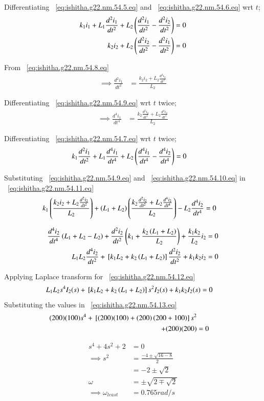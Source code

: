 \documentclass[journal,12pt,twocolumn]{IEEEtran}
\theoremstyle{remark}
\begin{document}
Differentiating ~\eqref{eq:ishitha.g22.nm.54.5.eq} and ~\eqref{eq:ishitha.g22.nm.54.6.eq} wrt $t$;
\begin{align}
k_1i_1 + L_1\frac{d^2i_1}{dt^2}+L_2\left(\frac{d^2i_1}{dt^2}-\frac{d^2i_2}{dt^2}\right)&=0
\label{eq:ishitha.g22.nm.54.7.eq} \\
 k_2i_2 + L_2\left(\frac{d^2i_2}{dt^2}-\frac{d^2i_1}{dt^2}\right)&=0
 \label{eq:ishitha.g22.nm.54.8.eq}
\end{align}

From ~\eqref{eq:ishitha.g22.nm.54.8.eq}
\begin{align}
\implies \frac{d^2i_1}{dt^2}&=\frac{k_2i_2+L_2\frac{d^2i_2}{dt^2}}{L_2}
\label{eq:ishitha.g22.nm.54.9.eq}
\end{align}

Differentiating ~\eqref{eq:ishitha.g22.nm.54.9.eq} wrt $t$ twice;
\begin{align}
\implies \frac{d^4i_1}{dt^4}&=\frac{k_2\frac{d^2i_2}{dt^2}+L_2\frac{d^4i_2}{dt^4}}{L_2}
\label{eq:ishitha.g22.nm.54.10.eq}
\end{align}

Differentiating ~\eqref{eq:ishitha.g22.nm.54.7.eq} wrt $t$ twice;
\begin{align}
k_1\frac{d^2i_1}{dt^2} + L_1\frac{d^4i_1}{dt^4}+L_2\left(\frac{d^4i_1}{dt^4}-\frac{d^4i_2}{dt^4}\right)&=0
\label{eq:ishitha.g22.nm.54.11.eq}
\end{align}

Substituting  ~\eqref{eq:ishitha.g22.nm.54.9.eq} and ~\eqref{eq:ishitha.g22.nm.54.10.eq} in ~\eqref{eq:ishitha.g22.nm.54.11.eq}
\begin{align}
k_1\left(\frac{k_2i_2+L_2\frac{d^2i_2}{dt^2}}{L_2}\right)+ \left(L_1+L_2\right)\left(\frac{k_2\frac{d^2i_2}{dt^2}+L_2\frac{d^4i_2}{dt^4}}{L_2}\right)-L_2\frac{d^4i_2}{dt^4}&=0
\end{align}

\begin{align}
\frac{d^4i_2}{dt^4}\left(L_1+L_2-L_2\right) + \frac{d^2i_2}{dt^2}\left(k_1+\frac{k_2\left(L_1+L_2\right)}{L_2}\right) + \frac{k_1k_2}{L_2}i_2&=0 \\
L_1L_2\frac{d^4i_2}{dt^2}+{}\left[k_1L_2+k_2\left(L_1+L_2\right)\right]\frac{d^2i_2}{dt^2} + k_1k_2i_2&=0
\label{eq:ishitha.g22.nm.54.12.eq}
\end{align}

Applying Laplace transform for ~\eqref{eq:ishitha.g22.nm.54.12.eq}
\begin{align}
L_1L_2s^4I_2(s)+{}\left[k_1L_2+k_2\left(L_1+L_2\right)\right]s^2I_2(s)+k_1k_2I_2(s)&=0
\label{eq:ishitha.g22.nm.54.13.eq}
\end{align}
Substituting the values in ~\eqref{eq:ishitha.g22.nm.54.13.eq}
\begin{align}
(200)(100)s^4+{}\left[(200)(100)+(200)\left(200+100\right)\right]s^2 \nonumber \\
+ (200)(200)&=0 
\end{align}

\begin{align}
s^4 +4s^2+2&=0\\
\implies s^2&=\frac{-4\pm \sqrt{16-8}}{2} \\
&= -2 \pm \sqrt{2} \\
\omega&=\pm\sqrt{2\mp \sqrt{2}}\\
\implies \omega_{least} &= 0.765 rad/s
\end{align}
\end{document}
